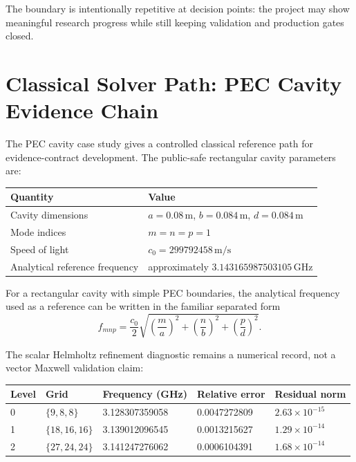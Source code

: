 \documentclass[11pt,a4paper]{article}
\begin{document}
The boundary is intentionally repetitive at decision points: the project may show meaningful research progress while still keeping validation and production gates closed.

\section{Classical Solver Path: PEC Cavity Evidence Chain}

The PEC cavity case study gives a controlled classical reference path for evidence-contract development. The public-safe rectangular cavity parameters are:

\begin{center}
\begin{tabular}{ll}
\toprule
Quantity & Value \\
\midrule
Cavity dimensions & $a=0.08\,\mathrm{m}$, $b=0.084\,\mathrm{m}$, $d=0.084\,\mathrm{m}$ \\
Mode indices & $m=n=p=1$ \\
Speed of light & $c_0=299792458\,\mathrm{m/s}$ \\
Analytical reference frequency & approximately $3.143165987503105\,\mathrm{GHz}$ \\
\bottomrule
\end{tabular}
\end{center}

For a rectangular cavity with simple PEC boundaries, the analytical frequency used as a reference can be written in the familiar separated form
\begin{equation}
f_{mnp} =
\frac{c_0}{2}
\sqrt{\left(\frac{m}{a}\right)^2+
      \left(\frac{n}{b}\right)^2+
      \left(\frac{p}{d}\right)^2}.
\label{eq:pec-reference-frequency}
\end{equation}

The scalar Helmholtz refinement diagnostic remains a numerical record, not a vector Maxwell validation claim:

\begin{center}
\begin{tabular}{lllll}
\toprule
Level & Grid & Frequency (GHz) & Relative error & Residual norm \\
\midrule
0 & $\{9,8,8\}$ & 3.128307359058 & 0.0047272809 & $2.63\times10^{-15}$ \\
1 & $\{18,16,16\}$ & 3.139012096545 & 0.0013215627 & $1.29\times10^{-14}$ \\
2 & $\{27,24,24\}$ & 3.141247276062 & 0.0006104391 & $1.68\times10^{-14}$ \\
\bottomrule
\end{tabular}
\end{center}
\end{document}
